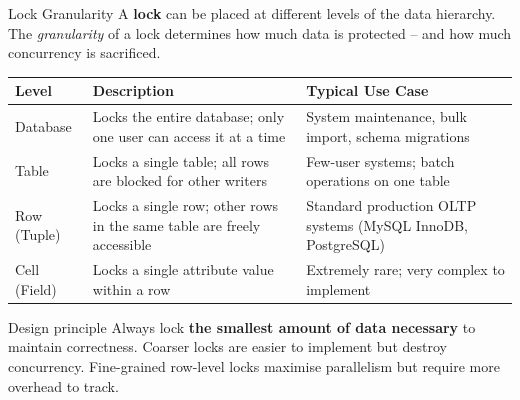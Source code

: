 \begin{frame}{Lock Granularity}
  A \textbf{lock} can be placed at different levels of the data hierarchy. The \emph{granularity}
  of a lock determines how much data is protected -- and how much concurrency is sacrificed.

  \medskip
  \begin{tabular}{@{}p{2cm}p{4.5cm}p{4cm}@{}}
    \toprule
    \textbf{Level} & \textbf{Description} & \textbf{Typical Use Case} \\
    \midrule
    Database & Locks the entire database; only one user can access it at a time &
               System maintenance, bulk import, schema migrations \\[4pt]
    Table    & Locks a single table; all rows are blocked for other writers &
               Few-user systems; batch operations on one table \\[4pt]
    Row (Tuple) & Locks a single row; other rows in the same table are freely accessible &
               Standard production OLTP systems (MySQL InnoDB, PostgreSQL) \\[4pt]
    Cell (Field) & Locks a single attribute value within a row &
               Extremely rare; very complex to implement \\
    \bottomrule
  \end{tabular}

  \medskip
  \begin{block}{Design principle}
    Always lock \textbf{the smallest amount of data necessary} to maintain correctness. Coarser
    locks are easier to implement but destroy concurrency. Fine-grained row-level locks maximise
    parallelism but require more overhead to track.
  \end{block}
\end{frame}

